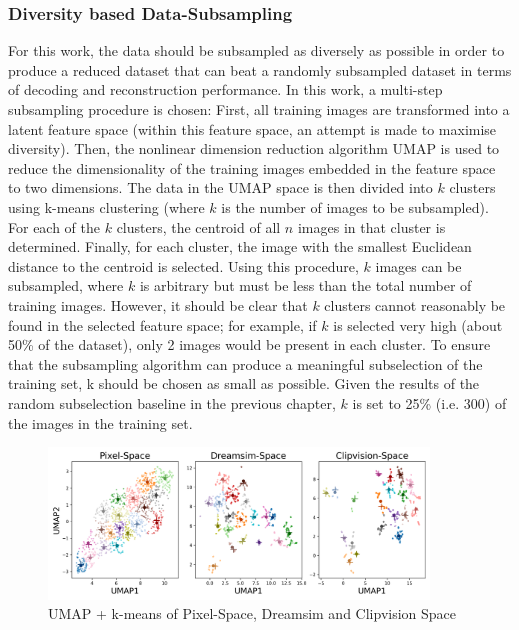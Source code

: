 \subsubsection{Diversity based Data-Subsampling}

For this work, the data should be subsampled as diversely as possible in order to produce a reduced dataset that can beat a randomly subsampled dataset in terms of decoding and reconstruction performance. In this work, a multi-step subsampling procedure is chosen: First, all training images are transformed into a latent feature space (within this feature space, an attempt is made to maximise diversity). Then, the nonlinear dimension reduction algorithm UMAP\cite{mcinnesUMAPUniformManifold2018} is used to reduce the dimensionality of the training images embedded in the feature space to two dimensions. The data in the UMAP space is then divided into $k$ clusters using k-means\cite{1056489} clustering (where $k$ is the number of images to be subsampled). For each of the $k$ clusters, the centroid of all $n$ images in that cluster is determined. Finally, for each cluster, the image with the smallest Euclidean distance to the centroid is selected. Using this procedure, $k$ images can be subsampled, where $k$ is arbitrary but must be less than the total number of training images. However, it should be clear that $k$ clusters cannot reasonably be found in the selected feature space; for example, if $k$ is selected very high (about 50\% of the dataset), only 2 images would be present in each cluster. To ensure that the subsampling algorithm can produce a meaningful subselection of the training set, k should be chosen as small as possible. Given the results of the random subselection baseline in the previous chapter, $k$ is set to 25\% (i.e. 300) of the images in the training set. 

\begin{figure}[ht]
    \centering
    \includegraphics[width=0.9\textwidth]{plots/dropout_umap.png}
    \caption{UMAP + k-means of Pixel-Space, Dreamsim and Clipvision Space}\label{fig:dropout_umap}
\end{figure}




